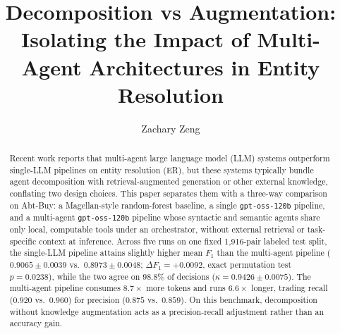 \documentclass[sigconf]{acmart}
\begin{document}
\title{Decomposition vs Augmentation: Isolating the Impact of Multi-Agent Architectures in Entity Resolution}

\author{Zachary Zeng}

\renewcommand{\shortauthors}{Zeng}

\begin{abstract}
Recent work reports that multi-agent large language model (LLM) systems outperform single-LLM pipelines on entity resolution (ER), but these systems typically bundle agent decomposition with retrieval-augmented generation or other external knowledge, conflating two design choices. This paper separates them with a three-way comparison on Abt-Buy: a Magellan-style random-forest baseline, a single \texttt{gpt-oss-120b} pipeline, and a multi-agent \texttt{gpt-oss-120b} pipeline whose syntactic and semantic agents share only local, computable tools under an orchestrator, without external retrieval or task-specific context at inference. Across five runs on one fixed 1,916-pair labeled test split, the single-LLM pipeline attains slightly higher mean $F_1$ than the multi-agent pipeline ($0.9065 \pm 0.0039$ vs.\ $0.8973 \pm 0.0048$; $\Delta F_1 = +0.0092$, exact permutation test $p = 0.0238$), while the two agree on $98.8\%$ of decisions ($\kappa = 0.9426 \pm 0.0075$). The multi-agent pipeline consumes $8.7\times$ more tokens and runs $6.6\times$ longer, trading recall ($0.920$ vs.\ $0.960$) for precision ($0.875$ vs.\ $0.859$). On this benchmark, decomposition without knowledge augmentation acts as a precision-recall adjustment rather than an accuracy gain.
\end{abstract}
\end{document}
